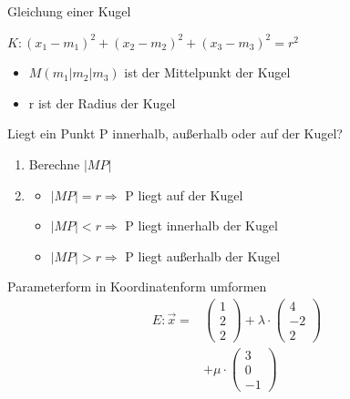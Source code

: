 \begin{frage}\LARGE
	Gleichung einer Kugel\end{frage}
\begin{antwort}$K: (x_1-m_1)^2+(x_2-m_2)^2+(x_3-m_3)^2=r^2$
	
	\begin{itemize} 
		\item $M(m_1|m_2|m_3)$ ist der Mittelpunkt der Kugel
		\item r ist der Radius der Kugel	
	\end{itemize}\end{antwort}
\begin{frage}\LARGE
	Liegt ein Punkt P innerhalb, außerhalb oder auf der Kugel?\end{frage}
\begin{antwort}\begin{enumerate} 
		\item Berechne $|MP|$
		\item\normalsize 	\begin{itemize}
				\item $|MP|=r \Rightarrow$ P liegt auf der Kugel
				\item $|MP|<r \Rightarrow$ P liegt innerhalb der Kugel
				\item $|MP|>r \Rightarrow$ P liegt außerhalb der Kugel
				\end{itemize}	
	\end{enumerate}\end{antwort}
\begin{frage}\LARGE
	Parameterform in Koordinatenform umformen
	\bigskip
	\normalsize
	\begin{align*}
		E:\vec{x}=&\left(\begin{array}{c} 1 \\ 2 \\ 2\end{array} \right)+\lambda \cdot \left(\begin{array}{c} 4 \\ -2 \\ 2\end{array} \right)\\
		&+\mu \cdot \left(\begin{array}{c} 3 \\0 \\ -1\end{array} \right)
	\end{align*}\end{frage}
